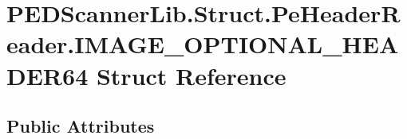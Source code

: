 \hypertarget{struct_p_e_d_scanner_lib_1_1_struct_1_1_pe_header_reader_1_1_i_m_a_g_e___o_p_t_i_o_n_a_l___h_e_a_d_e_r64}{}\section{P\+E\+D\+Scanner\+Lib.\+Struct.\+Pe\+Header\+Reader.\+I\+M\+A\+G\+E\+\_\+\+O\+P\+T\+I\+O\+N\+A\+L\+\_\+\+H\+E\+A\+D\+E\+R64 Struct Reference}
\label{struct_p_e_d_scanner_lib_1_1_struct_1_1_pe_header_reader_1_1_i_m_a_g_e___o_p_t_i_o_n_a_l___h_e_a_d_e_r64}
\subsection*{Public Attributes}
